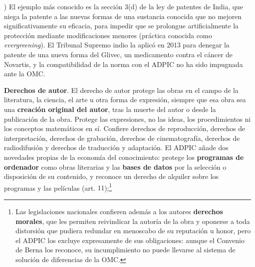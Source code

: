 \documentclass[10pt,a4paper]{article}
\newcounter{alphaitem}
\newenvironment{la}
      {\begin{list}{\alph{alphaitem})}{%
          \usecounter{alphaitem}%
          \setlength{\leftmargin}{1cm}%
          \setlength{\parskip}{3pt}%
          \setlength{\itemsep}{0pt}%
          \setlength{\parsep}{0pt}%
      }}
      {\end{list}}
\begin{document}
\begin{la}
{        El ejemplo más conocido es la sección 3(d) de la ley de patentes de India, que niega la patente a las nuevas formas de una sustancia conocida que no mejoren significativamente su eficacia, para impedir que se prolongue artificialmente la protección mediante modificaciones menores (práctica conocida como \textit{evergreening}). El Tribunal Supremo indio la aplicó en 2013 para denegar la patente de una nueva forma del Glivec, un medicamento contra el cáncer de Novartis, y la compatibilidad de la norma con el ADPIC no ha sido impugnada ante la OMC.
    }
    \item \textbf{Derechos de autor}. El derecho de autor protege las obras en el campo de la literatura, la ciencia, el arte u otra forma de expresión, siempre que esa obra sea una \textbf{creación original del autor}, tras la muerte del autor o desde la publicación de la obra. Protege las expresiones, no las ideas, los procedimientos ni los conceptos matemáticos en sí. Confiere derechos de reproducción, derechos de interpretación, derechos de grabación, derechos de cinematografía, derechos de radiodifusión y derechos de traducción y adaptación. El ADPIC añade dos novedades propias de la economía del conocimiento: protege los \textbf{programas de ordenador} como obras literarias y las \textbf{bases de datos} por la selección o disposición de su contenido, y reconoce un derecho de alquiler sobre los programas y las películas (art. $11$);\footnote{%
        Las legislaciones nacionales confieren además a los autores \textbf{derechos morales}, que les permiten reivindicar la autoría de la obra y oponerse a toda distorsión que pudiera redundar en menoscabo de su reputación u honor, pero el ADPIC los excluye expresamente de sus obligaciones: aunque el Convenio de Berna los reconoce, su incumplimiento no puede llevarse al sistema de solución de diferencias de la OMC.

}
\end{la}
\end{document}
